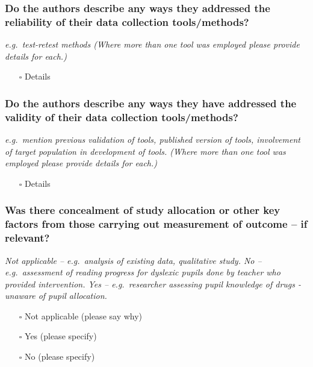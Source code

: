 \documentclass[
  doc, a4paper]{apa7}
\providecommand{\tightlist}{%
  \setlength{\itemsep}{0pt}\setlength{\parskip}{0pt}}
\begin{document}
\subsubsection{Do the authors describe any ways they addressed the reliability of their data collection tools/methods?}\label{do-the-authors-describe-any-ways-they-addressed-the-reliability-of-their-data-collection-toolsmethods}

\emph{e.g.~test-retest methods (Where more than one tool was employed please provide details for each.)}

\begin{itemize}
\tightlist
\item[$\square$]
  Details
\end{itemize}

\subsubsection{Do the authors describe any ways they have addressed the validity of their data collection tools/methods?}\label{do-the-authors-describe-any-ways-they-have-addressed-the-validity-of-their-data-collection-toolsmethods}

\emph{e.g.~mention previous validation of tools, published version of tools, involvement of target population in development of tools. (Where more than one tool was employed please provide details for each.)}

\begin{itemize}
\tightlist
\item[$\square$]
  Details
\end{itemize}

\subsubsection{Was there concealment of study allocation or other key factors from those carrying out measurement of outcome -- if relevant?}\label{was-there-concealment-of-study-allocation-or-other-key-factors-from-those-carrying-out-measurement-of-outcome-if-relevant}

\emph{Not applicable -- e.g.~analysis of existing data, qualitative study. No -- e.g.~assessment of reading progress for dyslexic pupils done by teacher who provided intervention. Yes -- e.g.~researcher assessing pupil knowledge of drugs - unaware of pupil allocation.}

\begin{itemize}
\tightlist
\item[$\square$]
  Not applicable (please say why)
\item[$\square$]
  Yes (please specify)
\item[$\square$]
  No (please specify)
\end{itemize}
\end{document}
